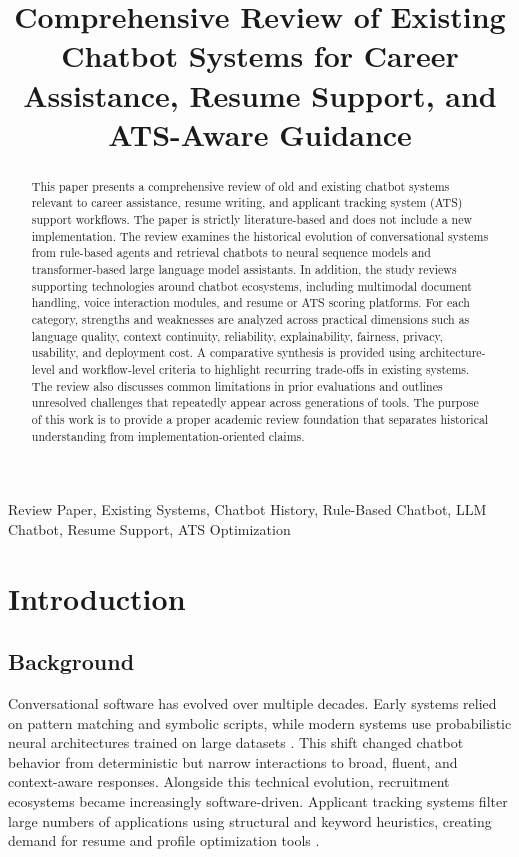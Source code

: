 \documentclass[conference]{IEEEtran}
\title{Comprehensive Review of Existing Chatbot Systems for Career Assistance, Resume Support, and ATS-Aware Guidance}
\author{
\IEEEauthorblockN{Amruta Anil Bargal, Prof. Dahane G.M.}
\IEEEauthorblockA{\textit{Department of Data Science Engineering}}
\IEEEauthorblockA{\textit{Dr. Vithalrao Vikhe Patil College Of Engineering, Ahmednagar, India}}
\IEEEauthorblockA{amruta442001@email.com, dahane\_it@enggnagar.com}
}
\begin{document}
\maketitle

\begin{abstract}
This paper presents a comprehensive review of old and existing chatbot systems relevant to career assistance, resume writing, and applicant tracking system (ATS) support workflows. The paper is strictly literature-based and does not include a new implementation. The review examines the historical evolution of conversational systems from rule-based agents and retrieval chatbots to neural sequence models and transformer-based large language model assistants. In addition, the study reviews supporting technologies around chatbot ecosystems, including multimodal document handling, voice interaction modules, and resume or ATS scoring platforms. For each category, strengths and weaknesses are analyzed across practical dimensions such as language quality, context continuity, reliability, explainability, fairness, privacy, usability, and deployment cost. A comparative synthesis is provided using architecture-level and workflow-level criteria to highlight recurring trade-offs in existing systems. The review also discusses common limitations in prior evaluations and outlines unresolved challenges that repeatedly appear across generations of tools. The purpose of this work is to provide a proper academic review foundation that separates historical understanding from implementation-oriented claims.
\end{abstract}

\begin{IEEEkeywords}
Review Paper, Existing Systems, Chatbot History, Rule-Based Chatbot, LLM Chatbot, Resume Support, ATS Optimization
\end{IEEEkeywords}

\section{Introduction}
\subsection{Background}
Conversational software has evolved over multiple decades. Early systems relied on pattern matching and symbolic scripts, while modern systems use probabilistic neural architectures trained on large datasets \cite{weizenbaum1966,wallace2009,adamopoulou2020}. This shift changed chatbot behavior from deterministic but narrow interactions to broad, fluent, and context-aware responses. Alongside this technical evolution, recruitment ecosystems became increasingly software-driven. Applicant tracking systems filter large numbers of applications using structural and keyword heuristics, creating demand for resume and profile optimization tools \cite{black2020}.
\end{document}
